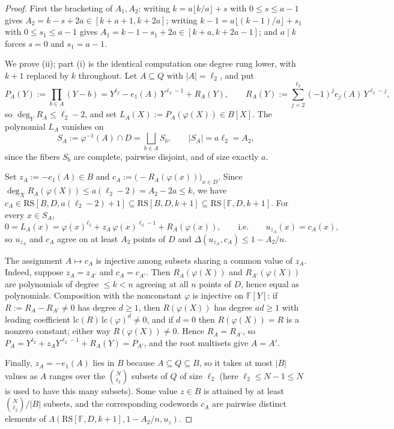 \documentclass[11pt]{article}
\theoremstyle{definition}
\theoremstyle{remark}
\newcommand{\F}{\mathbb{F}}
\newcommand{\B}{B}
\newcommand{\RS}{\mathrm{RS}}
\newcommand{\dist}{\Delta}
\newcommand{\Lst}{\Lambda}
\newcommand{\eone}{e_1}
\begin{document}
\begin{proof}
First the bracketing of $A_1,A_2$: writing $k=a\lfloor k/a\rfloor+s$ with $0\le s\le a-1$ gives $A_2=k-s+2a\in[k+a+1,k+2a]$; writing $k-1=a\lfloor(k-1)/a\rfloor+s_1$ with $0\le s_1\le a-1$ gives $A_1=k-1-s_1+2a\in[k+a,k+2a-1]$; and $a\mid k$ forces $s=0$ and $s_1=a-1$.

We prove (ii); part (i) is the identical computation one degree rung lower, with $k+1$ replaced by $k$ throughout. Let $A\subseteq Q$ with $|A|=\ell_2$, and put
\[
P_A(Y):=\prod_{b\in A}(Y-b)=Y^{\ell_2}-\eone(A)\,Y^{\ell_2-1}+R_A(Y),
\qquad
R_A(Y):=\sum_{j=2}^{\ell_2}(-1)^je_j(A)\,Y^{\ell_2-j},
\]
so $\deg_YR_A\le\ell_2-2$, and set $L_A(X):=P_A(\varphi(X))\in\B[X]$. The polynomial $L_A$ vanishes on
\[
S_A:=\varphi^{-1}(A)\cap D=\bigsqcup_{b\in A}S_b,
\qquad
|S_A|=a\ell_2=A_2,
\]
since the fibers $S_b$ are complete, pairwise disjoint, and of size exactly $a$.

Set $z_A:=-\eone(A)\in\B$ and $c_A:=\bigl(-R_A(\varphi(x))\bigr)_{x\in D}$. Since $\deg_XR_A(\varphi(X))\le a(\ell_2-2)=A_2-2a\le k$, we have $c_A\in\RS[\B,D,a(\ell_2-2)+1]\subseteq\RS[\B,D,k+1]\subseteq\RS[\F,D,k+1]$. For every $x\in S_A$,
\[
0=L_A(x)=\varphi(x)^{\ell_2}+z_A\,\varphi(x)^{\ell_2-1}+R_A(\varphi(x)),
\qquad\text{i.e.}\qquad
u_{z_A}(x)=c_A(x),
\]
so $u_{z_A}$ and $c_A$ agree on at least $A_2$ points of $D$ and $\dist(u_{z_A},c_A)\le1-A_2/n$.

The assignment $A\mapsto c_A$ is injective among subsets sharing a common value of $z_A$. Indeed, suppose $z_A=z_{A'}$ and $c_A=c_{A'}$. Then $R_A(\varphi(X))$ and $R_{A'}(\varphi(X))$ are polynomials of degree $\le k<n$ agreeing at all $n$ points of $D$, hence equal as polynomials. Composition with the nonconstant $\varphi$ is injective on $\F[Y]$: if $R:=R_A-R_{A'}\ne0$ has degree $d\ge1$, then $R(\varphi(X))$ has degree $ad\ge1$ with leading coefficient $\mathrm{lc}(R)\,\mathrm{lc}(\varphi)^d\ne0$, and if $d=0$ then $R(\varphi(X))=R$ is a nonzero constant; either way $R(\varphi(X))\ne0$. Hence $R_A=R_{A'}$, so $P_A=Y^{\ell_2}+z_AY^{\ell_2-1}+R_A(Y)=P_{A'}$, and the root multisets give $A=A'$.

Finally, $z_A=-\eone(A)$ lies in $\B$ because $A\subseteq Q\subseteq\B$, so it takes at most $|\B|$ values as $A$ ranges over the $\binom N{\ell_2}$ subsets of $Q$ of size $\ell_2$ (here $\ell_2\le N-1\le N$ is used to have this many subsets). Some value $z\in\B$ is attained by at least $\binom N{\ell_2}/|\B|$ subsets, and the corresponding codewords $c_A$ are pairwise distinct elements of $\Lst(\RS[\F,D,k+1],1-A_2/n,u_z)$.
\end{proof}
\end{document}
